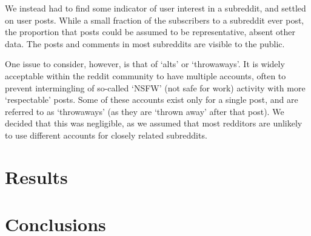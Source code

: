 \documentclass[journal, draftclsnofoot]{./styles/IEEEtran}
\begin{document}
We instead had to find some indicator of user interest in a subreddit,
and settled on user posts. While a small fraction of the subscribers to
a subreddit ever post, the proportion that posts could be assumed to be
representative, absent other data. The posts and comments in most
subreddits are visible to the public.

One issue to consider, however, is that of `alts' or `throwaways'.
It is widely acceptable within the reddit community to have multiple
accounts, often to prevent intermingling of so-called `NSFW' (not safe
for work) activity with more `respectable' posts. Some of these accounts
exist only for a single post, and are referred to as `throwaways' (as
they are `thrown away' after that post). We decided that this was
negligible, as we assumed that most redditors are unlikely to use
different accounts for closely related subreddits.

\section{Results}

\section{Conclusions}




\nocite{*}




\end{document}
